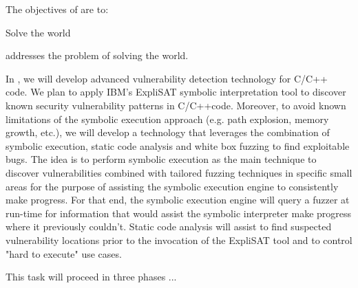 \addtocounter{wpno}{1}
\begin{Workpackage}{\thewpno}
\WPTitle{\wpname{\thewpno}}

\begin{WPObjectives}
The objectives of \theWP{} are to:
\begin{compactitem}
\item Solve the world
\end{compactitem}
\end{WPObjectives}

\begin{WPDescription}
\theWP{} addresses the problem of solving the world.
\end{WPDescription}

\begin{Task}

\TaskResults{%
}
\TaskHeader{}

In \theTask, we will develop advanced vulnerability detection technology for C/C++ code. We plan to apply IBM's ExpliSAT symbolic interpretation tool to discover known security vulnerability patterns in C/C++code. Moreover, to avoid known limitations of the symbolic execution approach (e.g. path explosion, memory growth, etc.), we will develop a technology that leverages the combination of symbolic execution, static code analysis and white box fuzzing to find exploitable bugs. The idea is to perform symbolic execution as the main technique to discover vulnerabilities combined with tailored fuzzing techniques in specific small areas for the purpose of assisting the symbolic execution engine to consistently make progress. For that end, the symbolic execution engine will query a fuzzer at run-time for information that would assist the symbolic interpreter make progress where it previously couldn't. Static code analysis will assist to find suspected vulnerability locations prior to the invocation of the ExpliSAT tool and to control "hard to execute" use cases.

This task will proceed in three phases ...


\end{Task}
\end{Workpackage}
